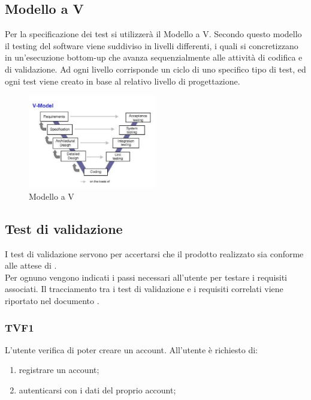 	\subsection{Modello a V}
	\label{modelloAV}
			Per la specificazione dei test si utilizzerà il Modello a V. Secondo questo modello il testing del software viene suddiviso in livelli differenti, i quali si concretizzano in un'esecuzione bottom-up che avanza sequenzialmente alle attività di codifica e di validazione. Ad ogni livello corrisponde un ciclo di uno specifico tipo di test, ed ogni test viene creato in base al relativo livello di progettazione.
			\begin{figure}[htp]
				\centering
				\includegraphics[width=0.5\textwidth]{img/V-model.jpg}
				\caption{Modello a V}
			\end{figure}
	\subsection{Test di validazione}
	\label{testDiValidazione}
	
		I test di validazione servono per accertarsi che il prodotto realizzato sia conforme alle attese di \PROPONENTE. \\
		Per ognuno vengono indicati i passi necessari all'utente per testare i requisiti associati. Il tracciamento tra i test di validazione e i requisiti correlati viene riportato nel documento \ARdoc.
		\subsubsection{TVF1}
			L'utente verifica di poter creare un account. All'utente è richiesto di:
			\begin{enumerate}
				\item registrare un account;
				\item autenticarsi con i dati del proprio account;
			\end{enumerate}
